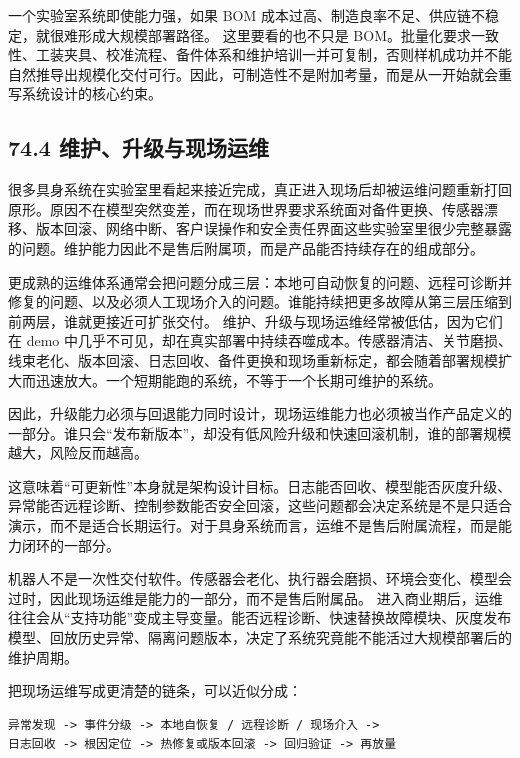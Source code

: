 一个实验室系统即使能力强，如果 BOM 成本过高、制造良率不足、供应链不稳定，就很难形成大规模部署路径。 这里要看的也不只是 BOM。批量化要求一致性、工装夹具、校准流程、备件体系和维护培训一并可复制，否则样机成功并不能自然推导出规模化交付可行。因此，可制造性不是附加考量，而是从一开始就会重写系统设计的核心约束。

\subsection*{74.4 维护、升级与现场运维}


很多具身系统在实验室里看起来接近完成，真正进入现场后却被运维问题重新打回原形。原因不在模型突然变差，而在现场世界要求系统面对备件更换、传感器漂移、版本回滚、网络中断、客户误操作和安全责任界面这些实验室里很少完整暴露的问题。维护能力因此不是售后附属项，而是产品能否持续存在的组成部分。

更成熟的运维体系通常会把问题分成三层：本地可自动恢复的问题、远程可诊断并修复的问题、以及必须人工现场介入的问题。谁能持续把更多故障从第三层压缩到前两层，谁就更接近可扩张交付。 维护、升级与现场运维经常被低估，因为它们在 demo 中几乎不可见，却在真实部署中持续吞噬成本。传感器清洁、关节磨损、线束老化、版本回滚、日志回收、备件更换和现场重新标定，都会随着部署规模扩大而迅速放大。一个短期能跑的系统，不等于一个长期可维护的系统。

因此，升级能力必须与回退能力同时设计，现场运维能力也必须被当作产品定义的一部分。谁只会“发布新版本”，却没有低风险升级和快速回滚机制，谁的部署规模越大，风险反而越高。

这意味着“可更新性”本身就是架构设计目标。日志能否回收、模型能否灰度升级、异常能否远程诊断、控制参数能否安全回滚，这些问题都会决定系统是不是只适合演示，而不是适合长期运行。对于具身系统而言，运维不是售后附属流程，而是能力闭环的一部分。

机器人不是一次性交付软件。传感器会老化、执行器会磨损、环境会变化、模型会过时，因此现场运维是能力的一部分，而不是售后附属品。 进入商业期后，运维往往会从“支持功能”变成主导变量。能否远程诊断、快速替换故障模块、灰度发布模型、回放历史异常、隔离问题版本，决定了系统究竟能不能活过大规模部署后的维护周期。

把现场运维写成更清楚的链条，可以近似分成：

\begin{lstlisting}
异常发现 -> 事件分级 -> 本地自恢复 / 远程诊断 / 现场介入 ->
日志回收 -> 根因定位 -> 热修复或版本回滚 -> 回归验证 -> 再放量
\end{lstlisting}

